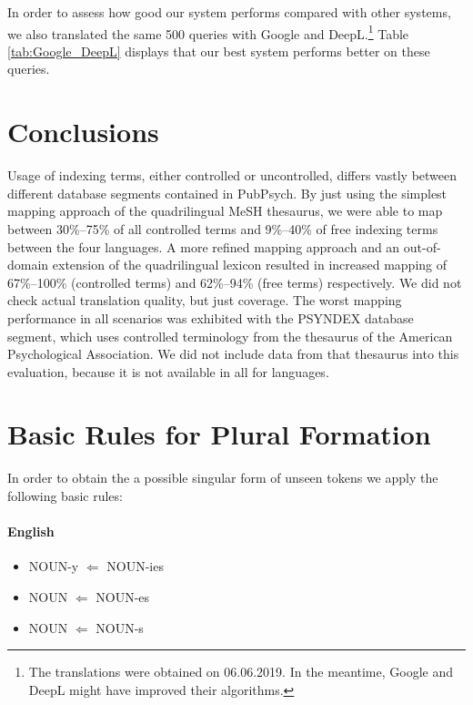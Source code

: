 \documentclass[a4paper,11pt]{article}
\begin{document}
In order to assess how good our system performs compared with other systems, we also translated the same 500 queries with Google and DeepL.\footnote{The translations were obtained on 06.06.2019. In the meantime, Google and DeepL might have improved their algorithms.} 
Table \ref{tab:Google_DeepL} displays that our best system performs better on these queries.


	\section{Conclusions}
	\label{s:conclusions}
	
	Usage of indexing terms, either controlled or uncontrolled, differs vastly between different database segments contained in PubPsych. By just using the simplest mapping approach of the quadrilingual MeSH thesaurus, we were able to map between 30\%--75\% of all controlled terms and 9\%--40\% of free indexing terms between the four languages. A more refined mapping approach and an out-of-domain extension of the quadrilingual lexicon resulted in increased mapping of 67\%--100\% (controlled terms) and 62\%--94\% (free terms) respectively. We did not check actual translation quality, but just coverage. The worst mapping performance in all scenarios was exhibited with the PSYNDEX database segment, which uses controlled terminology from the thesaurus of the American Psychological Association. We did not include data from that thesaurus into this evaluation, because it is not available in all for languages.
	
	\appendix
	\section{Basic Rules for Plural Formation}
	\label{ap:plural}
	
	In order to obtain the a possible singular form of unseen tokens we apply the following basic rules:
	
	\renewcommand{\labelitemi}{$\star$}
	\paragraph{English}
	\begin{itemize}
		\itemsep-0.2em 
		\item NOUN-y $\Leftarrow$ NOUN-ies
		\item NOUN $\Leftarrow$ NOUN-es
		\item NOUN $\Leftarrow$ NOUN-s
	\end{itemize}
	
\end{document}
